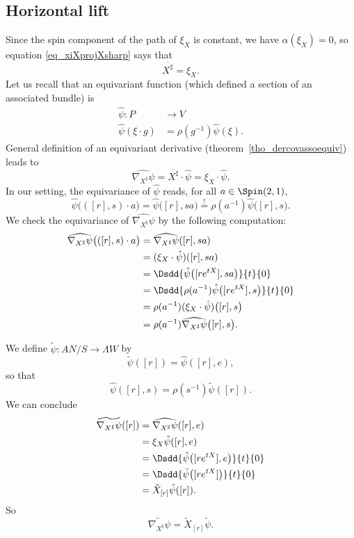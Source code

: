 \subsection{Horizontal lift}

Since the spin component of the path of $\xi_{X}$ is constant, we have $\alpha(\xi_{X})=0$, so equation  \eqref{eq_xiXprojXsharp} says that
\begin{equation}
	\overline{ X^{\sharp} }=\xi_{X}.
\end{equation}
Let us recall that an equivariant function (which defined a section of an associated bundle) is
\begin{equation}
	\begin{aligned}
		\hat{\psi}\colon P     & \to V                          \\
		\hat{\psi}(\xi\cdot g) & = \rho(g^{-1})\hat{\psi}(\xi).
	\end{aligned}
\end{equation}
General definition of an equivariant derivative (theorem~\ref{tho_dercovassoequiv}) leads to
\[
	\widehat{    \nabla_{X^{\sharp}}\psi    }=\overline{ X^{\sharp} }\cdot\hat{\psi}=\xi_{X} \cdot \hat{\psi}.
\]
In our setting, the equivariance of $\hat{\psi}$ reads, for all $a\in\Spin(2,1)$,
\[
	\hat{\psi}\big( ([r],s)\cdot a \big)=\hat{\psi}\big( [r],sa \big)\stackrel{!}{=}\rho(a^{-1})\hat{\psi}\big( [r],s \big).
\]
We check the equivariance of $\widehat{\nabla_{X^{\sharp}}\psi}$ by the following computation:
\[
	\begin{split}
		\widehat{\nabla_{X^{\sharp}}\psi  }\big( ([r],s)\cdot a \big)&=\widehat{\nabla_{X^{\sharp}}\psi}( [r],sa )\\
		&=(\xi_{X}\cdot \hat{\psi})([r],sa)\\
		&=\Dsdd{ \hat{\psi}\big( [r e^{tX}],sa \big) }{t}{0}\\
		&=\Dsdd{ \rho(a^{-1})\hat{\psi}\big( [r e^{tX}],s \big) }{t}{0}\\
		&=\rho(a^{-1})(\xi_{X}\cdot \hat{\psi})\big( [r],s \big)\\
		&=\rho(a^{-1})\widehat{  \nabla_{X^{\sharp}}\psi  }\big( [r],s \big).
	\end{split}
\]

We define $\tilde{\psi}\colon AN/S\to \Lambda W$ by
\[
	\tilde{\psi}([r])=\hat{\psi}( [r],e ),
\]
so that
\begin{equation}
	\hat{\psi}([r],s)=\rho(s^{-1})\tilde{\psi}([r]).
\end{equation}
We can conclude
\[
	\begin{split}
		\widetilde{ \nabla_{X^{\sharp}}\psi  }([r])&=\widehat{\nabla_{X^{\sharp}}\psi}([r],e)\\
		&=\xi_{X}\hat{\psi}([r],e)\\
		&=\Dsdd{ \hat{\psi}\big( [r e^{tX}],e \big) }{t}{0}\\
		&=\Dsdd{ \tilde{\psi}\big( [r e^{tX}] \big) }{t}{0}\\
		&=\tilde X_{[r]}\tilde{\psi}([r]).
	\end{split}
\]
So
\begin{equation}
	\widetilde{\nabla_{X^{\sharp}}\psi}=\tilde X_{[r]}\tilde{\psi}.
\end{equation}

